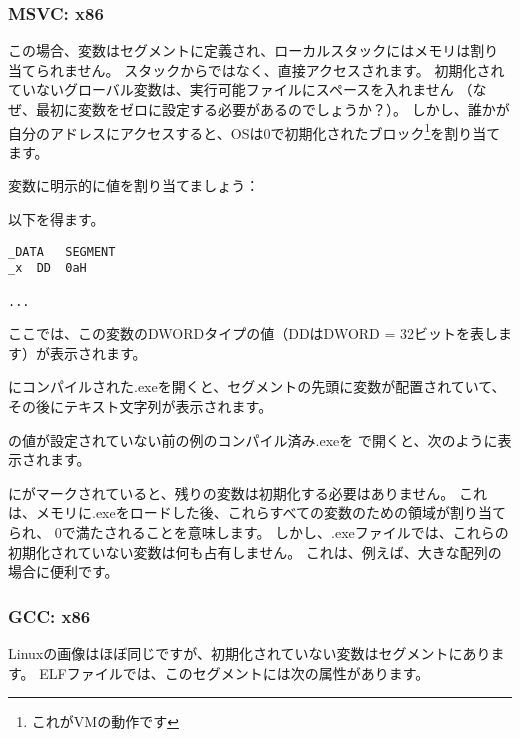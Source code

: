 \subsubsection{MSVC: x86}



この場合、変数はセグメントに定義され、ローカルスタックにはメモリは割り当てられません。 スタックからではなく、直接アクセスされます。 
初期化されていないグローバル変数は、実行可能ファイルにスペースを入れません
（なぜ、最初に変数をゼロに設定する必要があるのでしょうか？）。
しかし、誰かが自分のアドレスにアクセスすると、\ac{OS}は0で初期化されたブロック\footnote{これが\ac{VM}の動作です}を割り当てます。

変数に明示的に値を割り当てましょう：



以下を得ます。

\begin{lstlisting}[style=customasmx86]
_DATA	SEGMENT
_x	DD	0aH

...
\end{lstlisting}

ここでは、この変数のDWORDタイプの値（DDはDWORD = 32ビットを表します）が表示されます。

\IDA にコンパイルされた.exeを開くと、セグメントの先頭に変数が配置されていて、
その後にテキスト文字列が表示されます。

の値が設定されていない前の例のコンパイル済み.exeを \IDA で開くと、次のように表示されます。



にがマークされていると、残りの変数は初期化する必要はありません。 
これは、メモリに.exeをロードした後、これらすべての変数のための領域が割り当てられ、
0で満たされることを意味します。 
しかし、.exeファイルでは、これらの初期化されていない変数は何も占有しません。 
これは、例えば、大きな配列の場合に便利です。



\subsubsection{GCC: x86}

Linuxの画像はほぼ同じですが、初期化されていない変数はセグメントにあります。 
\ac{ELF}ファイルでは、このセグメントには次の属性があります。

